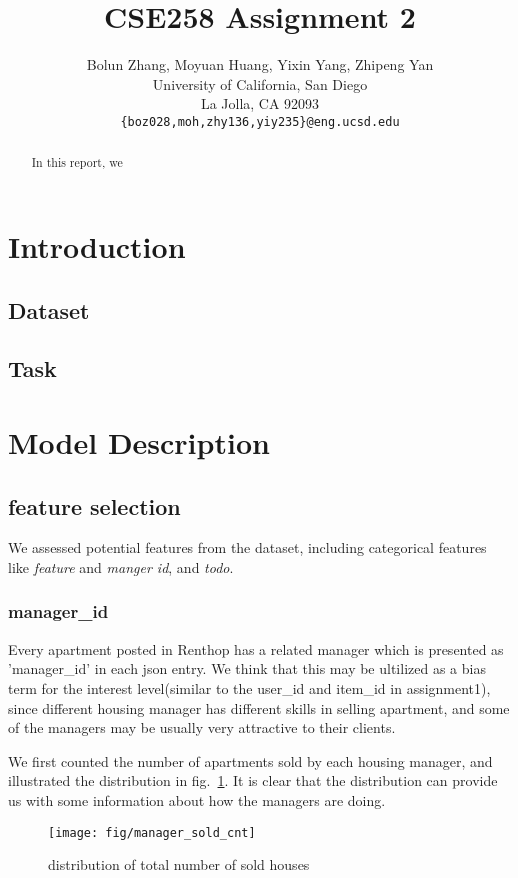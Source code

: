 \documentclass{article} %
\title{CSE258 Assignment 2}
\author{
Bolun Zhang, Moyuan Huang, Yixin Yang, Zhipeng Yan\\
University of California, San Diego\\
La Jolla, CA 92093 \\
\texttt{\{boz028,moh,zhy136,yiy235\}@eng.ucsd.edu} 
}
\begin{document}
\maketitle

\begin{abstract}
In this report, we
\end{abstract}

\section{Introduction}
\subsection{Dataset}
\subsection{Task}

\section{Model Description}
\subsection{feature selection}
We assessed potential features from the dataset, including categorical features like \textit{feature} and \textit{manger id}, and \textit{todo}.
\subsubsection{manager\_id}
Every apartment posted in Renthop has a related manager which is presented as 'manager\_id' in each json entry. We think that this may be ultilized as a bias term for the interest level(similar to the user\_id and item\_id in assignment1), since different housing manager has different skills in selling apartment, and some of the managers may be usually very attractive to their clients.

We first counted the number of apartments sold by each housing manager, and illustrated the distribution in fig.~\ref{fig:mng-cnt}. It is clear that the distribution can provide us with some information about how the managers are doing.
\begin{figure}[h]
	\centering
	\texttt{[image: fig/manager\_sold\_cnt]}
	\caption{distribution of total number of sold houses}
	\label{fig:mng-cnt}
\end{figure}
\end{document}
